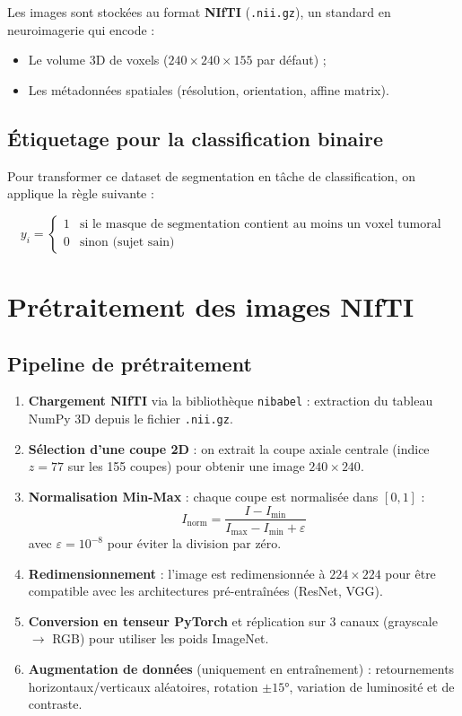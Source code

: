 \documentclass[12pt, a4paper]{report}
\begin{document}
Les images sont stockées au format \textbf{NIfTI} (\texttt{.nii.gz}),
un standard en neuroimagerie qui encode :
\begin{itemize}
  \item Le volume 3D de voxels ($240 \times 240 \times 155$ par défaut) ;
  \item Les métadonnées spatiales (résolution, orientation, affine matrix).
\end{itemize}

\subsection{Étiquetage pour la classification binaire}

Pour transformer ce dataset de segmentation en tâche de classification,
on applique la règle suivante :

\[
  y_i =
  \begin{cases}
    1 & \text{si le masque de segmentation contient au moins un voxel tumoral} \\
    0 & \text{sinon (sujet sain)}
  \end{cases}
\]

\section{Prétraitement des images NIfTI}

\subsection{Pipeline de prétraitement}

\begin{enumerate}
  \item \textbf{Chargement NIfTI} via la bibliothèque \texttt{nibabel} :
        extraction du tableau NumPy 3D depuis le fichier \texttt{.nii.gz}.

  \item \textbf{Sélection d'une coupe 2D} : on extrait la coupe axiale centrale
        (indice $z = 77$ sur les 155 coupes) pour obtenir une image $240 \times 240$.

  \item \textbf{Normalisation Min-Max} : chaque coupe est normalisée dans $[0, 1]$ :
        \[
          I_{\text{norm}} = \frac{I - I_{\min}}{I_{\max} - I_{\min} + \varepsilon}
        \]
        avec $\varepsilon = 10^{-8}$ pour éviter la division par zéro.

  \item \textbf{Redimensionnement} : l'image est redimensionnée à $224 \times 224$
        pour être compatible avec les architectures pré-entraînées (ResNet, VGG).

  \item \textbf{Conversion en tenseur PyTorch} et réplication sur 3 canaux
        (grayscale $\to$ RGB) pour utiliser les poids ImageNet.

  \item \textbf{Augmentation de données} (uniquement en entraînement) :
        retournements horizontaux/verticaux aléatoires, rotation $\pm15°$,
        variation de luminosité et de contraste.
\end{enumerate}
\end{document}

